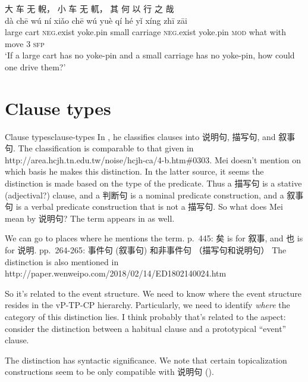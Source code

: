 \documentclass[UTF8, a4paper, oneside, scheme=plain, 12pt]{ctexrep}
\newcommand*{\citepage}[1]{p.~{#1}}
\newcommand*{\citepages}[1]{pp.~{#1}}
\newcommand{\translate}[1]{`#1'}
\newcommand*{\category}[1]{\textsc{#1}}
\begin{document}
\begin{exe}
    \ex\label{ex:grammatical.clause.sfp.interrogative.1}
    \glll 大 车 无 輗， 小 车 无 軏， 其 何 以 行 之 哉 \\
    dà chē wú ní xiǎo chē wú yuè qí hé yǐ xíng zhī zāi \\
    large cart \category{neg}.exist yoke.pin small carriage \category{neg}.exist yoke.pin \category{mod} what with move 3 \category{sfp} \\
    \glt\translate{If a large cart has no yoke-pin and a small carriage has no yoke-pin, how could one drive them?}
\end{exe}

\chapter{Clause types}

\begin{todobox}{Clause types}{clause-types}
    In \citet[\citepage{131}]{meiguang2018},
    he classifies clauses into 说明句, 描写句, and 叙事句.
    The classification is comparable to that given in http://area.hcjh.tn.edu.tw/noise/hcjh-ca/4-b.htm\#0303.
    Mei doesn't mention on which basis he makes this distinction.
    In the latter source, it seems the distinction is made based on the type of the predicate.
    Thus a 描写句 is a stative (adjectival?) clause,
    and a 判断句 is a nominal predicate construction,
    and a 叙事句 is a verbal predicate construction that is not a 描写句.
    So what does Mei mean by 说明句?
    The term appears in \citet{li2004grammar} as well.


    We can go to places where he mentions the term.
    \citepage{445}: 矣 is for 叙事, and 也 is for 说明.
    \citepages{264-265}: 事件句 (叙事句) 和非事件句 （描写句和说明句）
    The distinction is also mentioned in http://paper.wenweipo.com/2018/02/14/ED1802140024.htm
    
    So it's related to the event structure.
    We need to know where the event structure resides in the vP-TP-CP hierarchy.
    Particularly, we need to identify \emph{where} the category of this distinction lies.
    I think probably that's related to the aspect:
    consider the distinction between a habitual clause and a prototypical ``event'' clause.
    
    The distinction has syntactic significance.
    We note that certain topicalization constructions seem to be only compatible with 说明句
    ().
\end{todobox}
\end{document}
